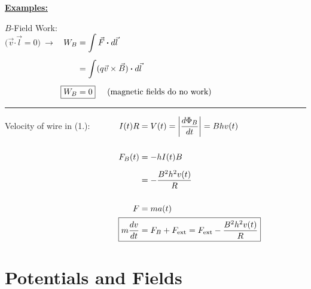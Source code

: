 \documentclass[12pt]{article}
\newcommand*{\dotP}{\boldsymbol \cdot}		%
\begin{document}
\vspace{15pt}\noindent 
\textbf{\underline{Examples:}}\\[15pt]
\noindent
\begin{minipage}[t]{.46\textwidth}
	\(B\)-Field Work:\\[5pt]
	\( \big( \vec{v} \dotP \vec{l} = 0 \big) \ \rightarrow \ \) 
	\( \begin{aligned}[t]
		W_B &= \int \vec{F} \dotP d\vec{l} \\[5pt]
		&= \int ( q \vec{v} \times \vec{B} ) \dotP d\vec{l} \\[5pt]
		\Aboxed{ W_B &= 0 } \hspace{.5cm} \text{(magnetic fields do no work)}
	\end{aligned} \)	
\end{minipage}
\rule[-165pt]{.5pt}{185pt}
\hspace{20pt}
\begin{minipage}[t]{.49\textwidth}
	Velocity of wire in (1.): \ \ \ \ \ \
	\( \begin{aligned}[t]
		I(t) R &= V(t) = \left| \frac{d \Phi_B}{dt} \right| = B h v(t) \\[15pt]
		F_B(t) &= - h I(t) B \\[5pt]
		&= - \frac{B^2 h^2 v(t)}{R} \\[15pt]
		F &= m a(t) \\
		\Aboxed{ m \frac{dv}{dt} &= F_B + F_\text{ext} = F_\text{ext} - \frac{B^2 h^2 v(t)}{R} }
	\end{aligned} \)
\end{minipage}

\newpage
\section{Potentials and Fields}
\end{document}
